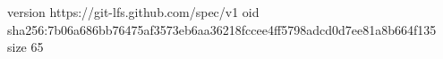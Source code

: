 version https://git-lfs.github.com/spec/v1
oid sha256:7b06a686bb76475af3573eb6aa36218fccee4ff5798adcd0d7ee81a8b664f135
size 65
